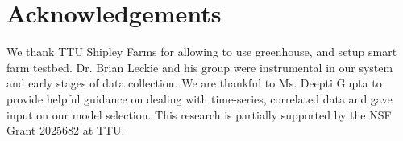 \section{Acknowledgements}
\label{sec:ack}
We thank TTU Shipley Farms for allowing to use greenhouse, and setup smart farm testbed. Dr. Brian Leckie and his group were instrumental in our system and early stages of data collection. We are thankful to Ms. Deepti Gupta to provide helpful guidance on dealing with time-series, correlated data and gave input on our model selection. This research is partially supported by the NSF Grant 2025682 at TTU.